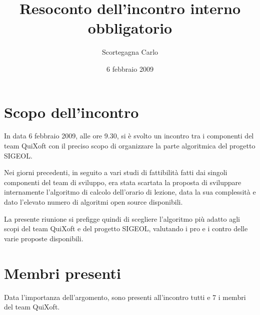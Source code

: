 \documentclass[11pt,a4paper]{article}
\title{Resoconto dell’incontro interno obbligatorio}
\author{Scortegagna Carlo}
\date{6 febbraio 2009}
\begin{document}
\maketitle
\section{Scopo dell'incontro}
In data 6 febbraio 2009, alle ore 9.30, si è svolto un incontro tra i componenti del team QuiXoft con il preciso scopo di organizzare la parte algoritmica del progetto SIGEOL.

Nei giorni precedenti, in seguito a vari studi di fattibilità fatti dai singoli componenti del team di sviluppo, era stata scartata la proposta di sviluppare internamente l'algoritmo di calcolo dell'orario di lezione, data la sua complessità e dato l'elevato numero di algoritmi open source disponibili.

La presente riunione si prefigge quindi di scegliere l'algoritmo più adatto agli scopi del team QuiXoft e del progetto SIGEOL, valutando i pro e i contro delle varie proposte disponibili.
\section{Membri presenti}
Data l'importanza dell'argomento, sono presenti all'incontro tutti e 7 i membri del team QuiXoft.
\end{document}
